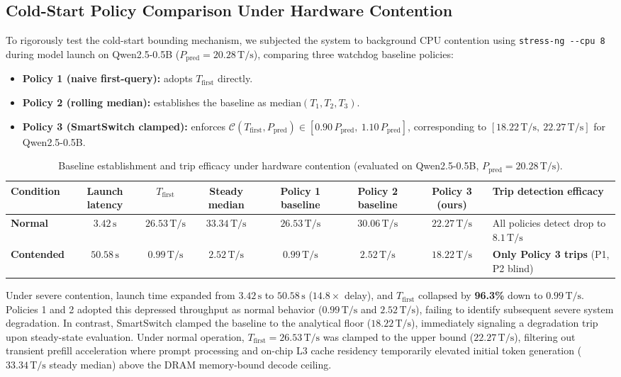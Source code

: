\documentclass[11pt,a4paper]{article}
\newcommand{\Tfirst}{T_{\mathrm{first}}}
\newcommand{\Ppred}{P_{\mathrm{pred}}}
\newcommand{\Cfun}{\mathcal{C}}
\newcommand{\Ts}{\,\mathrm{T/s}}
\newcommand{\su}{\,\mathrm{s}}
\newcommand{\code}[1]{\texttt{#1}}
\begin{document}
\subsection{Cold-Start Policy Comparison Under Hardware Contention}
To rigorously test the cold-start bounding mechanism, we subjected the system to background CPU contention using \code{stress-ng -{}-cpu 8} during model launch on Qwen2.5-0.5B ($\Ppred = 20.28\Ts$), comparing three watchdog baseline policies:
\begin{itemize}[leftmargin=*]
\item \textbf{Policy 1 (naive first-query):} adopts $\Tfirst$ directly.
\item \textbf{Policy 2 (rolling median):} establishes the baseline as $\mathrm{median}(T_1, T_2, T_3)$.
\item \textbf{Policy 3 (SmartSwitch clamped):} enforces $\Cfun(\Tfirst, \Ppred) \in [0.90\,\Ppred,\ 1.10\,\Ppred]$, corresponding to $[18.22\Ts,\ 22.27\Ts]$ for Qwen2.5-0.5B.
\end{itemize}

\begin{table}[h]
\centering
\caption{Baseline establishment and trip efficacy under hardware contention (evaluated on Qwen2.5-0.5B, $\Ppred = 20.28\Ts$).}\label{tab:policy}
\footnotesize
\setlength{\tabcolsep}{3pt}
\begin{tabularx}{\linewidth}{@{}>{\raggedright\arraybackslash}p{1.45cm}CCCCCCL@{}}
\toprule
\textbf{Condition} & \textbf{Launch latency} & \textbf{$\Tfirst$} & \textbf{Steady median} & \textbf{Policy 1 baseline} & \textbf{Policy 2 baseline} & \textbf{Policy 3 (ours)} & \textbf{Trip detection efficacy} \\
\midrule
\textbf{Normal} & $3.42\su$ & $26.53\Ts$ & $33.34\Ts$ & $26.53\Ts$ & $30.06\Ts$ & $\mathbf{22.27}\Ts$ & All policies detect drop to $8.1\Ts$ \\
\textbf{Contended} & $50.58\su$ & $\mathbf{0.99}\Ts$ & $2.52\Ts$ & $0.99\Ts$ & $2.52\Ts$ & $\mathbf{18.22}\Ts$ & \textbf{Only Policy 3 trips} (P1, P2 blind) \\
\bottomrule
\end{tabularx}
\end{table}

Under severe contention, launch time expanded from $3.42\su$ to $50.58\su$ ($14.8\times$ delay), and $\Tfirst$ collapsed by \textbf{96.3\%} down to $0.99\Ts$. Policies 1 and 2 adopted this depressed throughput as normal behavior ($0.99\Ts$ and $2.52\Ts$), failing to identify subsequent severe system degradation. In contrast, SmartSwitch clamped the baseline to the analytical floor ($18.22\Ts$), immediately signaling a degradation trip upon steady-state evaluation. Under normal operation, $\Tfirst = 26.53\Ts$ was clamped to the upper bound ($22.27\Ts$), filtering out transient prefill acceleration where prompt processing and on-chip L3 cache residency temporarily elevated initial token generation ($33.34\Ts$ steady median) above the DRAM memory-bound decode ceiling.
\end{document}
